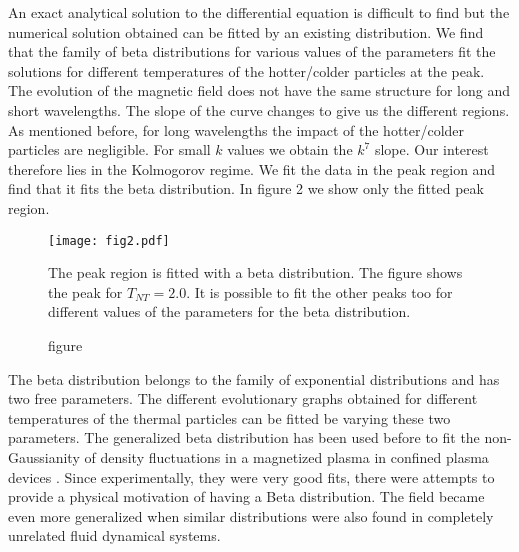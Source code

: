\documentclass{ws-mpla}
\begin{document}
An exact analytical solution to the differential equation is difficult to find but the numerical solution obtained can be fitted by an existing distribution. We
find that the family of beta distributions for various values of the parameters fit the solutions for different temperatures of the hotter/colder particles at the peak. 
The evolution of the magnetic field does not have the same structure for long and short wavelengths. The slope of the curve changes to give us the different regions. 
As mentioned before, for long wavelengths the impact of the hotter/colder particles are negligible. For small $k$ values we obtain the $k^7$ slope. Our interest therefore 
lies in the Kolmogorov regime. We fit the data in the peak region and find that it fits the beta distribution. In figure 2 we show only the 
fitted peak region.  
\begin{figure}
\begin{center}
	\texttt{[image: fig2.pdf]}
	\caption{figure}{The peak region is fitted with a beta distribution. The figure shows the peak for $T_{NT} = 2.0$. It is possible to fit the other peaks too 
	for different values of the parameters for the beta distribution.}
\end{center}
\end{figure}


The beta distribution belongs to the family of exponential distributions and  has two free parameters. The different evolutionary graphs obtained for different temperatures of the thermal 
particles can be fitted be varying these two parameters. The generalized beta distribution has been used before to fit the non-Gaussianity of density fluctuations in 
a magnetized plasma in confined plasma devices \cite{labit}. Since experimentally, they were very good fits, there were attempts to provide a physical motivation 
of having a Beta distribution. The field became even more generalized when similar distributions were also found in completely unrelated fluid dynamical systems. 
\end{document}
